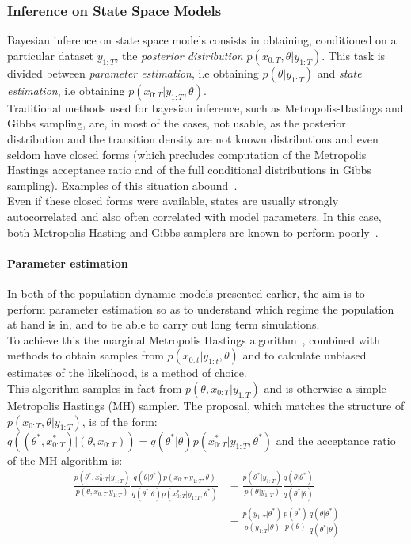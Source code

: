 \documentclass[12pt]{article}
\begin{document}
	\subsubsection{Inference on State Space Models}
	Bayesian inference on state space models consists in obtaining, conditioned on a particular dataset $y_{1:T}$, the \emph{posterior distribution} $p(x_{0:T}, \theta| y_{1:T})$. This task is divided between \emph{parameter estimation}, i.e obtaining $p(\theta | y_{1:T})$  and \emph{state estimation}, i.e obtaining $p(x_{0:T}|y_{1:T}, \theta)$. \\
	Traditional methods used for bayesian inference, such as Metropolis-Hastings and Gibbs sampling, are, in most of the cases, not usable, as the posterior distribution and the transition density are not known distributions and even seldom have closed forms (which precludes computation of the Metropolis Hastings acceptance ratio and of the full conditional distributions in Gibbs sampling). Examples of this situation abound~\cite{beskos2006exact, fearnhead2008particle, murray2011particle}.\\
	Even if these closed forms were available, states are usually strongly autocorrelated and also often correlated with model parameters. In this case, both Metropolis Hasting and Gibbs samplers are known to perform poorly~\cite{van2011partially}. \\

	
	\paragraph{Parameter estimation}
	In both of the population dynamic models presented earlier, the aim is to perform parameter estimation so as to understand which regime the population at hand is in, and to be able to carry out long term simulations. \\
	To achieve this the marginal Metropolis Hastings algorithm~\cite{hastings1970monte}, combined with methods to obtain samples from  $p(x_{0:t}| y_{1:t}, \theta)$ and to calculate unbiased estimates of the likelihood, is a method of choice. \\
	This algorithm samples in fact from $p(\theta, x_{0:T} | y_{1:T})$ and is otherwise a simple Metropolis Hastings (MH) sampler. The proposal, which matches the structure of $p(x_{0:T}, \theta | y_{1:T})$, is of the form: $q((\theta^*, x_{0:T}^*) | (\theta, x_{0:T})) = q(\theta^* | \theta)p(x_{0:T}^* | y_{1:T}, \theta^*)$ and the acceptance ratio of the MH algorithm is: 
	\begin{align*}
	\frac{p(\theta^*, x_{0:T}^* | y_{1:T})}{p(\theta, x_{0:T} | y_{1:T})}\frac{q(\theta | \theta^*)p(x_{0:T} | y_{1:T}, \theta)}{q(\theta^* | \theta)p(x_{0:T}^* | y_{1:T}, \theta^*)} & = \frac{p(\theta^* | y_{1:T})}{p(\theta | y_{1:T})}\frac{q(\theta | \theta^*)}{q(\theta^* | \theta)} \\
	& = \frac{p(y_{1:T} | \theta^*)}{p(y_{1:T}|\theta)}\frac{p(\theta^*)}{p(\theta)}\frac{q(\theta | \theta^*)}{q(\theta^* | \theta)}
	\end{align*}
	
\end{document}
